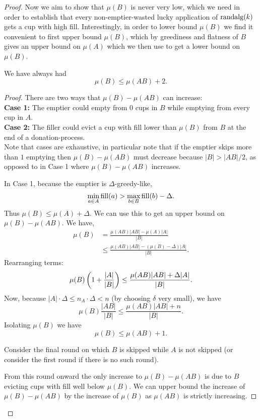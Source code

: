 \begin{proof}
Now we aim to show that $\mu(B)$ is never very low, which we need
in order to establish that every non-emptier-wasted lucky
application of $\operatorname{\text{\textup{randalg}}}(k)$ gets a cup with high fill.
Interestingly, in order to lower bound $\mu(B)$ we find it
convenient to first upper bound $\mu(B)$, which by greediness and
flatness of $B$ gives an upper bound on $\mu(A)$ which we then
use to get a lower bound on $\mu(B)$.

\begin{clm}
  \label{clm:muBdoesntgettoobig}
  We have always had
  $$\mu(B) \le \mu(AB) + 2.$$
\end{clm}
\begin{proof}
  There are two ways that $\mu(B)-\mu(A B)$ can increase: \\
  \textbf{Case 1:}
  The emptier could empty from $0$ cups in $B$ while emptying
  from every cup in $A$. \\
  \textbf{Case 2:}
  The filler could evict a cup with fill lower than $\mu(B)$ from
  $B$ at the end of a donation-process. \\

  Note that cases are exhaustive, in particular note that if the
  emptier skips more than $1$ emptying then $\mu(B) - \mu(AB)$
  must decrease because $|B| > |AB|/2$, as opposed to in Case 1
  where $\mu(B) - \mu(AB)$ increases.

  In Case 1, because the emptier is $\Delta$-greedy-like,
  $$\min_{a\in A} \operatorname{\text{\textup{fill}}}(a) > \max_{b\in B} \operatorname{\text{\textup{fill}}}(b) - \Delta.$$
  Thus $\mu(B) \le \mu(A) + \Delta$. We can use this to get an
  upper bound on $\mu(B) - \mu(AB)$. We have, 
  \begin{align*}
    \mu(B) &= \frac{\mu(AB) |AB| - \mu(A) |A|}{|B|}\\
           &\le \frac{\mu(AB) |AB| - (\mu(B) - \Delta) |A|}{|B|}.
  \end{align*}
  Rearranging terms:
  $$\mu(B) \left( 1+\frac{|A|}{|B|} \right) \le \frac{\mu(AB) |AB| + \Delta |A|}{|B|}.$$
  Now, because $|A| \cdot \Delta \le n_A
  \cdot \Delta < n$ (by choosing $\delta$ very small), we have 
  $$\mu(B) \frac{|AB|}{|B|}\le \frac{\mu(AB) |AB| + n}{|B|}.$$
  Isolating $\mu(B)$ we have 
  $$\mu(B) \le \mu(AB) + 1.$$

  Consider the final round on which $B$ is skipped while $A$ is
  not skipped (or consider the first round if there is no such
  round).

  From this round onward the only increase to $\mu(B) - \mu(A
  B)$ is due to $B$ evicting cups with fill well below $\mu(B)$.
  We can upper bound the increase of $\mu(B) - \mu(AB)$ by the
  increase of $\mu(B)$ as $\mu(AB)$ is strictly increasing.


\end{proof}
\end{proof}
